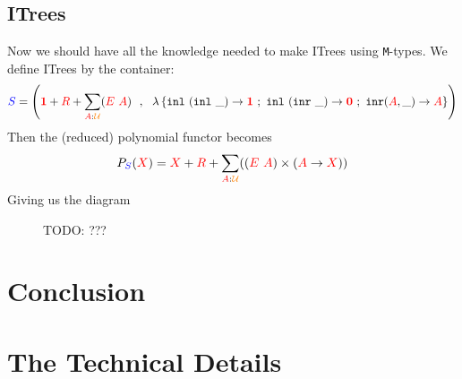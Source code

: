 \documentclass[twoside,11pt,openright]{report}
\newcommand*{\term}[1]{\textcolor{green!70!black}{#1}}
\newcommand*{\type}[1]{\textcolor{red}{#1}}
\newcommand*{\container}[1]{\textcolor{blue}{#1}}
\newcommand*{\universe}[1]{\textcolor{orange}{#1}}
\newcommand*{\unit}{\type{\textbf{1}}}
\newcommand*{\empt}{\type{\textbf{0}}}
\begin{document}
\section{ITrees}
Now we should have all the knowledge needed to make ITrees using \texttt{M}-types. We define ITrees by the container:
\begin{equation}
  \container{S} = \left( \unit+\type{R}+\sum_{\type{A}:\universe{\mathcal{U}}} (\type{E}~\type{A}) ~~,~~ \lambda\left\{ \texttt{inl}~(\texttt{inl}~\_) \rightarrow \unit ~;~ \texttt{inl}~(\texttt{inr}~\_) \rightarrow \empt ~;~ \texttt{inr} (\type{A},\_)  \rightarrow \type{A} \right\} \right)
\end{equation}
Then the (reduced) polynomial functor becomes
\begin{equation}
  P_{\container{S}}(\type{X}) = \type{X} + \type{R} + \sum_{\type{A} : \universe{\mathcal{U}}} ((\type{E}~\type{A}) \times (\type{A} \rightarrow \type{X}))
\end{equation}
Giving us the diagram
\begin{figure}[h]
  \centering
  \caption{TODO: ???}
\end{figure}


\chapter{Conclusion}
\label{ch:conclusion}



\cleardoublepage
{}
 



\cleardoublepage
\appendix
\chapter{The Technical Details}

\todo[inline]{\dots}
\end{document}
